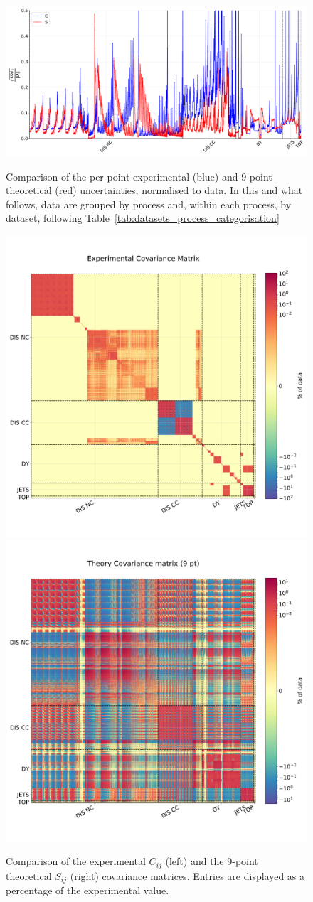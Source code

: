 \begin{figure}[t!]
  \begin{center}
    \includegraphics[width=1.0\linewidth]{mhous/plots/9pt_diagonal_elements.pdf}
    \caption{\small Comparison of the per-point experimental 
    (blue) and 9-point theoretical (red) uncertainties, normalised to data. In this and what follows, data are grouped by process and, within each process, by dataset, following
  Table~\ref{tab:datasets_process_categorisation} 
        \label{fig:diag_covmats} }
  \end{center}
  \begin{center}
    \includegraphics[width=0.49\linewidth]{mhous/plots/exp_covmat.pdf}
    \includegraphics[width=0.49\linewidth]{mhous/plots/th_covmat_9pt.pdf}
    \caption{\label{fig:covmats}\small Comparison of the  experimental $C_{ij}$ (left)
      and the 9-point theoretical  $S_{ij}$  
      (right) covariance matrices.
      Entries are displayed as a percentage of the experimental value.
      }
  \end{center}
\end{figure}
